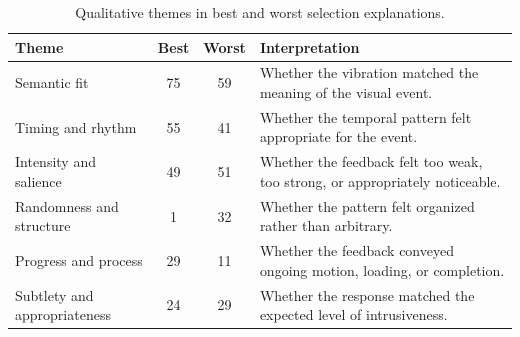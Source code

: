 \begin{table}[!htbp]
\centering
\small
\begin{tabular}{|>{\raggedright\arraybackslash}p{1.85in}|c|c|>{\raggedright\arraybackslash}p{2.25in}|}
\hline
\textbf{Theme} & \textbf{Best} & \textbf{Worst} & \textbf{Interpretation} \\
\hline
Semantic fit & 75 & 59 & Whether the vibration matched the meaning of the visual event. \\
\hline
Timing and rhythm & 55 & 41 & Whether the temporal pattern felt appropriate for the event. \\
\hline
Intensity and salience & 49 & 51 & Whether the feedback felt too weak, too strong, or appropriately noticeable. \\
\hline
Randomness and structure & 1 & 32 & Whether the pattern felt organized rather than arbitrary. \\
\hline
Progress and process & 29 & 11 & Whether the feedback conveyed ongoing motion, loading, or completion. \\
\hline
Subtlety and appropriateness & 24 & 29 & Whether the response matched the expected level of intrusiveness. \\
\hline
\end{tabular}
\caption{Qualitative themes in best and worst selection explanations.}
\label{tab:qualitative-themes}
\end{table}
